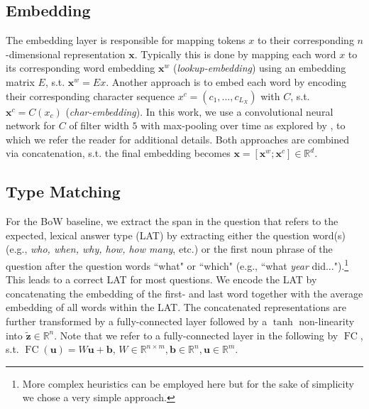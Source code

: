 \documentclass[11pt,a4paper]{article}
\begin{document}
\subsection{Embedding}\label{sec:embedder}

The embedding layer is responsible for mapping tokens $x$ to their corresponding $n$-dimensional representation $\boldsymbol{x}$. Typically this is done by mapping each word $x$ to its corresponding word embedding $\boldsymbol{x}^w$ (\textit{lookup-embedding}) using an embedding matrix $E$, s.t. $\boldsymbol{x}^w = E x$. Another approach is to embed each word by encoding their corresponding character sequence $x^c=(c_1, ..., c_{L_X})$ with $C$, s.t. $\boldsymbol{x}^c=C(x_c)$ (\textit{char-embedding}). In this work, we use a convolutional neural network for $C$ of filter width $5$ with max-pooling over time as explored by , to which we refer the reader for additional details. Both approaches are combined via concatenation, s.t. the final embedding becomes $\boldsymbol{x}=\left[ \boldsymbol{x}^w ; \boldsymbol{x}^c \right] \in \mathbb{R}^d$.


\subsection{Type Matching}
For the BoW baseline, we extract the span in the question that refers to the expected, lexical answer type (LAT) by extracting either the question word(s) (e.g., \textit{who, when, why, how, how many}, etc.) or the first noun phrase of the question after the question words ``what" or ``which" (e.g., ``what \textit{year} did...").\footnote{More complex heuristics can be employed here but for the sake of simplicity we chose a very simple approach.} This leads to a correct LAT for most questions. We encode the LAT by concatenating the embedding of the first- and last word together with the average embedding of all words within the LAT. The concatenated representations are further transformed by a fully-connected layer followed by a $\tanh$ non-linearity into $\boldsymbol{\tilde{z}} \in \mathbb{R}^n$. Note that we refer to a fully-connected layer in the following by $\operatorname{FC}$, s.t. $\operatorname{FC}(\boldsymbol{u})=W\boldsymbol{u}+\boldsymbol{b}$, $W\in \mathbb{R}^{n \times m}, \boldsymbol{b}\in\mathbb{R}^n, \boldsymbol{u}\in\mathbb{R}^m$.
\end{document}

